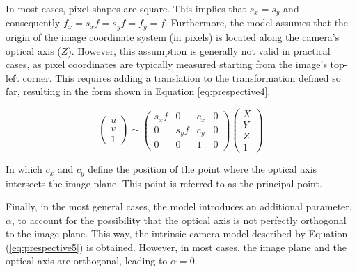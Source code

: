 In most cases, pixel shapes are square. This implies that $s_x = s_y$ and consequently $ f_x = s_x f = s_y f = f_y = f$.
Furthermore, the model assumes that the origin of the image coordinate system (in pixels) is located along the camera's optical axis ($Z$). However, this assumption is generally not valid in practical cases, as pixel coordinates are typically measured starting from the image's top-left corner.
This requires adding a translation to the transformation defined so far, resulting in the form shown in Equation \ref{eq:prespective4}.

\begin{equation} 
    \label{eq:prespective4}
    \begin{pmatrix}
    u \\ 
    v \\ 
    1
    \end{pmatrix}
    \sim
    \begin{pmatrix}
    s_x f & 0 & c_x & 0 \\ 
    0 & s_y f & c_y & 0 \\ 
    0 & 0 & 1 & 0
    \end{pmatrix}
    \begin{pmatrix}
    X \\ 
    Y \\ 
    Z \\ 
    1
    \end{pmatrix}
\end{equation}

In which $c_x$ and $c_y$ define the position of the point where the optical axis intersects the image plane. This point is referred to as the principal point.

Finally, in the most general cases, the model introduces an additional parameter, $\alpha$, to account for the possibility that the optical axis is not perfectly orthogonal to the image plane. This way, the intrinsic camera model described by Equation (\ref{eq:prespective5}) is obtained.
However, in most cases, the image plane and the optical axis are orthogonal, leading to $\alpha = 0$.


